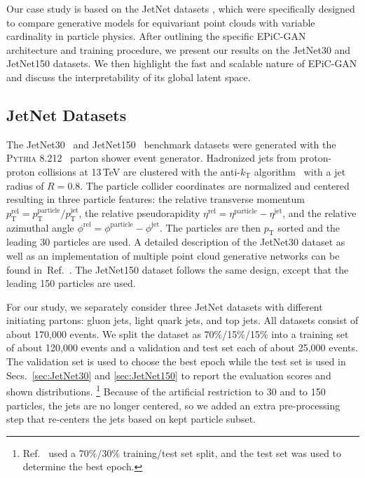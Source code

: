 \documentclass[a4paper,submission, Phys]{SciPost}
\DeclareRobustCommand{\Secs}[2]{Secs.~\ref{sec:#1} and \ref{sec:#2}}
\DeclareRobustCommand{\Reff}[1]{Ref.~\cite{#1}}
\begin{document}
Our case study is based on the JetNet datasets \cite{JetNet30,JetNet150}, which were specifically designed to compare generative models for equivariant point clouds with variable cardinality in particle physics. 
%
After outlining the specific EPiC-GAN architecture and training procedure, we present our results on the JetNet30 and JetNet150 datasets.
%
We then highlight the fast and scalable nature of EPiC-GAN and discuss the interpretability of its global latent space.



\subsection{JetNet Datasets}
\label{sec:datasets}

The JetNet30~\cite{JetNet30} and JetNet150~\cite{JetNet150} benchmark datasets were generated with the \textsc{Pythia} 8.212~\cite{Pythia} parton shower event generator.
%
Hadronized jets from proton-proton collisions at 13\,TeV are clustered with the anti-$k_\mathrm{T}$ algorithm~\cite{Cacciari_2008_anti_kt}
with a jet radius of $R=0.8$.
%
The particle collider coordinates are normalized and centered resulting in three particle features: 
%
the relative transverse momentum $p_\mathrm{T}^\mathrm{rel} = p_\mathrm{T}^\mathrm{particle} / p_\mathrm{T}^\mathrm{jet}$, the relative pseudorapidity $\eta^\mathrm{rel}=
\eta^\mathrm{particle} - \eta^\mathrm{jet}$, and the relative azimuthal angle $\phi^\mathrm{rel}=\phi^\mathrm{particle} - \phi^\mathrm{jet}$. 
%
The particles are then $p_\mathrm{T}$ sorted and the leading 30 particles are used.
%
A detailed description of the JetNet30 dataset as well as an implementation of multiple point cloud generative networks can be found in~\Reff{MPGAN}. 
%
The JetNet150 dataset follows the same design, except that the leading 150 particles are used.


For our study, we separately consider three JetNet datasets with different initiating partons:  gluon jets, light quark jets, and top jets. 
%
All datasets consist of about 170,000 events. 
%
We split the dataset as 70\%/15\%/15\% into a training set of about 120,000 events and a validation and test set each of about 25,000 events. 
%
The validation set is used to choose the best epoch while the test set is used in \Secs{JetNet30}{JetNet150} to report the evaluation scores and shown distributions.%
%
\footnote{\Reff{MPGAN} used a 70\%/30\% training/test set split, and the test set was used to determine the best epoch.}
%
Because of the artificial restriction to 30 and to 150 particles, the jets are no longer centered, so we added an extra pre-processing step that re-centers the jets based on kept particle subset.
\end{document}

